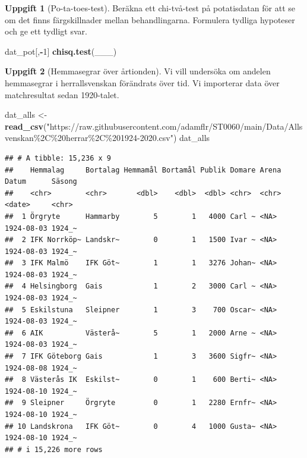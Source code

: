 \documentclass[
]{book}
\newenvironment{Shaded}{\begin{snugshade}}{\end{snugshade}}
\newcommand{\DecValTok}[1]{\textcolor[rgb]{0.00,0.00,0.81}{#1}}
\newcommand{\FunctionTok}[1]{\textcolor[rgb]{0.13,0.29,0.53}{\textbf{#1}}}
\newcommand{\NormalTok}[1]{#1}
\newcommand{\OtherTok}[1]{\textcolor[rgb]{0.56,0.35,0.01}{#1}}
\newcommand{\SpecialCharTok}[1]{\textcolor[rgb]{0.81,0.36,0.00}{\textbf{#1}}}
\newcommand{\StringTok}[1]{\textcolor[rgb]{0.31,0.60,0.02}{#1}}
\theoremstyle{definition}
\theoremstyle{definition}
\theoremstyle{definition}
\newtheorem{exercise}{Uppgift}[chapter]
\theoremstyle{definition}
\theoremstyle{remark}
\begin{document}
\begin{exercise}[Po-ta-toes-test]

Beräkna ett chi-två-test på potatisdatan för att se om det finns färgskillnader mellan behandlingarna. Formulera tydliga hypoteser och ge ett tydligt svar.

\begin{Shaded}
\begin{Highlighting}[]
\NormalTok{dat\_pot[,}\SpecialCharTok{{-}}\DecValTok{1}\NormalTok{]}
\FunctionTok{chisq.test}\NormalTok{(\_\_\_)}
\end{Highlighting}
\end{Shaded}

\end{exercise}

\begin{exercise}[Hemmasegrar över årtionden]

Vi vill undersöka om andelen hemmasegrar i herrallsvenskan förändrats över tid. Vi importerar data över matchresultat sedan 1920-talet.

\begin{Shaded}
\begin{Highlighting}[]
\NormalTok{dat\_alls }\OtherTok{\textless{}{-}} \FunctionTok{read\_csv}\NormalTok{(}\StringTok{"https://raw.githubusercontent.com/adamflr/ST0060/main/Data/Allsvenskan\%2C\%20herrar\%2C\%201924{-}2020.csv"}\NormalTok{)}
\NormalTok{dat\_alls}
\end{Highlighting}
\end{Shaded}

\begin{verbatim}
## # A tibble: 15,236 x 9
##    Hemmalag     Bortalag Hemmamål Bortamål Publik Domare Arena Datum      Säsong
##    <chr>        <chr>       <dbl>    <dbl>  <dbl> <chr>  <chr> <date>     <chr> 
##  1 Örgryte      Hammarby        5        1   4000 Carl ~ <NA>  1924-08-03 1924_~
##  2 IFK Norrköp~ Landskr~        0        1   1500 Ivar ~ <NA>  1924-08-03 1924_~
##  3 IFK Malmö    IFK Göt~        1        1   3276 Johan~ <NA>  1924-08-03 1924_~
##  4 Helsingborg  Gais            1        2   3000 Carl ~ <NA>  1924-08-03 1924_~
##  5 Eskilstuna   Sleipner        1        3    700 Oscar~ <NA>  1924-08-03 1924_~
##  6 AIK          Västerå~        5        1   2000 Arne ~ <NA>  1924-08-03 1924_~
##  7 IFK Göteborg Gais            1        3   3600 Sigfr~ <NA>  1924-08-08 1924_~
##  8 Västerås IK  Eskilst~        0        1    600 Berti~ <NA>  1924-08-10 1924_~
##  9 Sleipner     Örgryte         0        1   2280 Ernfr~ <NA>  1924-08-10 1924_~
## 10 Landskrona   IFK Göt~        0        4   1000 Gusta~ <NA>  1924-08-10 1924_~
## # i 15,226 more rows
\end{verbatim}


\end{exercise}
\end{document}
